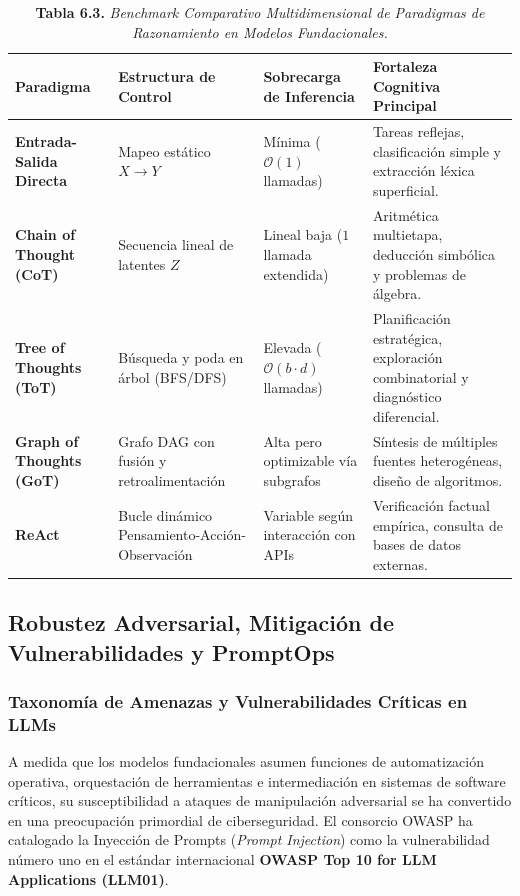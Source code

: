 \begin{table}[htpb!]
\centering
\small
\renewcommand{\arraystretch}{1.3}
\begin{tabularx}{\textwidth}{>{\raggedright\arraybackslash\bfseries}p{2.6cm} >{\centering\arraybackslash}p{2.0cm} >{\centering\arraybackslash}p{2.0cm} >{\raggedright\arraybackslash}X}
\toprule
Paradigma & Estructura de Control & Sobrecarga de Inferencia & Fortaleza Cognitiva Principal \\
\midrule
Entrada-Salida Directa & Mapeo estático $X \to Y$ & Mínima ($\mathcal{O}(1)$ llamadas) & Tareas reflejas, clasificación simple y extracción léxica superficial. \\
Chain of Thought (CoT) & Secuencia lineal de latentes $Z$ & Lineal baja ($1$ llamada extendida) & Aritmética multietapa, deducción simbólica y problemas de álgebra. \\
Tree of Thoughts (ToT) & Búsqueda y poda en árbol (BFS/DFS) & Elevada ($\mathcal{O}(b \cdot d)$ llamadas) & Planificación estratégica, exploración combinatorial y diagnóstico diferencial. \\
Graph of Thoughts (GoT) & Grafo DAG con fusión y retroalimentación & Alta pero optimizable vía subgrafos & Síntesis de múltiples fuentes heterogéneas, diseño de algoritmos. \\
ReAct & Bucle dinámico Pensamiento-Acción-Observación & Variable según interacción con APIs & Verificación factual empírica, consulta de bases de datos externas. \\
\bottomrule
\end{tabularx}
\caption{\textbf{Tabla 6.3.} \textit{Benchmark Comparativo Multidimensional de Paradigmas de Razonamiento en Modelos Fundacionales.}}
\label{tab:reasoning_benchmark}
\end{table}

\newpage
\subsection{Robustez Adversarial, Mitigación de Vulnerabilidades y PromptOps}

\subsubsection{Taxonomía de Amenazas y Vulnerabilidades Críticas en LLMs}

A medida que los modelos fundacionales asumen funciones de automatización operativa, orquestación de herramientas e intermediación en sistemas de software críticos, su susceptibilidad a ataques de manipulación adversarial se ha convertido en una preocupación primordial de ciberseguridad. El consorcio OWASP ha catalogado la Inyección de Prompts (\textit{Prompt Injection}) como la vulnerabilidad número uno en el estándar internacional \textbf{OWASP Top 10 for LLM Applications (LLM01)}.

